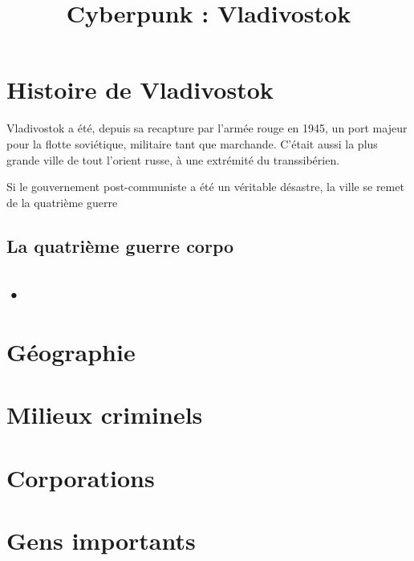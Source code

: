 \documentclass[10pt,a4paper]{article}
\title{Cyberpunk : Vladivostok}
\begin{document}
\maketitle
\tableofcontents

\chapter{Histoire de Vladivostok}
Vladivostok a été, depuis sa recapture par l'armée rouge en 1945, un port majeur pour la flotte soviétique, militaire tant que marchande. C'était aussi la plus grande ville de tout l'orient russe, à une extrémité du transsibérien.

Si le gouvernement post-communiste a été un véritable désastre, la ville se remet de la quatrième guerre 
\section{La quatrième guerre corpo}
\section{•}
\chapter{Géographie}
\chapter{Milieux criminels}
\chapter{Corporations}
\chapter{Gens importants}
\end{document}
